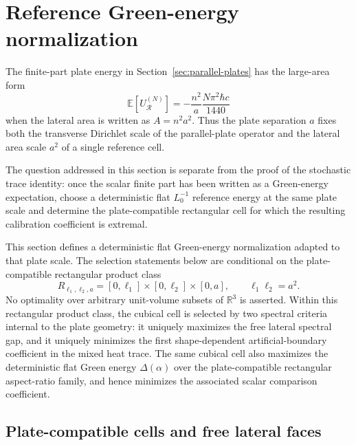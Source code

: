 \documentclass[11pt]{article}
\newcommand{\R}{\mathbb{R}}
\newcommand{\E}{\mathbb{E}}
\begin{document}
\section{Reference Green-energy normalization}
\label{sec:reference-green-normalization}
\label{sec:box-integral}

The finite-part plate energy in Section~\ref{sec:parallel-plates} has the
large-area form
\begin{equation}
    \E[U_{\mathcal R}^{(N)}]
    =
    -\frac{n^2}{a}\frac{N\pi^2\hbar c}{1440}
    \label{eq:reference-plate-energy-na}
\end{equation}
when the lateral area is written as \(A=n^2a^2\).  Thus the plate separation
\(a\) fixes both the transverse Dirichlet scale of the parallel-plate
operator and the lateral area scale \(a^2\) of a single reference cell.

The question addressed in this section is separate from the proof of the
stochastic trace identity: once the scalar finite part has been written as a
Green-energy expectation, choose a deterministic flat \(L_0^{-1}\) reference
energy at the same plate scale and determine the plate-compatible
rectangular cell for which the resulting calibration coefficient is
extremal.

This section defines a deterministic flat Green-energy normalization adapted
to that plate scale.  The selection statements below are conditional on the
plate-compatible rectangular product class
\[
    R_{\ell_1,\ell_2,a}
    =
    [0,\ell_1]\times[0,\ell_2]\times[0,a],
    \qquad
    \ell_1\ell_2=a^2.
\]
No optimality over arbitrary unit-volume subsets of \(\R^3\) is asserted.
Within this rectangular product class, the cubical cell is selected by two
spectral criteria internal to the plate geometry: it uniquely maximizes the
free lateral spectral gap, and it uniquely minimizes the first
shape-dependent artificial-boundary coefficient in the mixed heat trace.  The
same cubical cell also maximizes the deterministic flat Green energy
\(\Delta(\alpha)\) over the plate-compatible rectangular aspect-ratio family,
and hence minimizes the associated scalar comparison coefficient.

\subsection{Plate-compatible cells and free lateral faces}
\label{sec:plate-compatible-cells}
\end{document}

